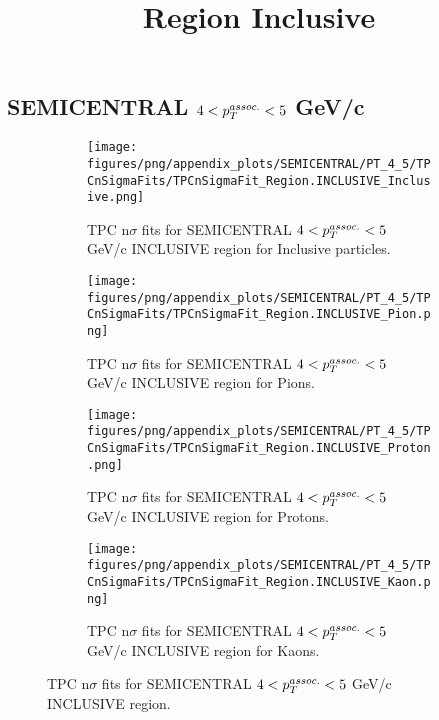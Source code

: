     
            \subsection{SEMICENTRAL $4 < \pTassoc < 5$ GeV/c}
            \begin{figure}[H]
                \title{Region Inclusive}
                \begin{subfigure}[b]{0.5\textwidth}
                    \centering
                    \texttt{[image: figures/png/appendix\_plots/SEMICENTRAL/PT\_4\_5/TPCnSigmaFits/TPCnSigmaFit\_Region.INCLUSIVE\_Inclusive.png]}
                    \caption{TPC n$\sigma$ fits for SEMICENTRAL $4 < \pTassoc < 5$ GeV/c INCLUSIVE region for Inclusive particles.}
                    \label{fig:appendix_SEMICENTRAL_$4 < \pTassoc < 5$ GeV/c_INCLUSIVE_Inclusive}
                \end{subfigure}
                \begin{subfigure}[b]{0.5\textwidth}
                    \centering
                    \texttt{[image: figures/png/appendix\_plots/SEMICENTRAL/PT\_4\_5/TPCnSigmaFits/TPCnSigmaFit\_Region.INCLUSIVE\_Pion.png]}
                    \caption{TPC n$\sigma$ fits for SEMICENTRAL $4 < \pTassoc < 5$ GeV/c INCLUSIVE region for Pions.}
                    \label{fig:appendix_SEMICENTRAL_$4 < \pTassoc < 5$ GeV/c_INCLUSIVE_Pion}
                \end{subfigure}
                \begin{subfigure}[b]{0.5\textwidth}
                    \centering
                    \texttt{[image: figures/png/appendix\_plots/SEMICENTRAL/PT\_4\_5/TPCnSigmaFits/TPCnSigmaFit\_Region.INCLUSIVE\_Proton.png]}
                    \caption{TPC n$\sigma$ fits for SEMICENTRAL $4 < \pTassoc < 5$ GeV/c INCLUSIVE region for Protons.}
                    \label{fig:appendix_SEMICENTRAL_$4 < \pTassoc < 5$ GeV/c_INCLUSIVE_Proton}
                \end{subfigure}
                \begin{subfigure}[b]{0.5\textwidth}
                    \centering
                    \texttt{[image: figures/png/appendix\_plots/SEMICENTRAL/PT\_4\_5/TPCnSigmaFits/TPCnSigmaFit\_Region.INCLUSIVE\_Kaon.png]}
                    \caption{TPC n$\sigma$ fits for SEMICENTRAL $4 < \pTassoc < 5$ GeV/c INCLUSIVE region for Kaons.}
                    \label{fig:appendix_SEMICENTRAL_$4 < \pTassoc < 5$ GeV/c_INCLUSIVE_Kaon}
                \end{subfigure}
                \caption{TPC n$\sigma$ fits for SEMICENTRAL $4 < \pTassoc < 5$ GeV/c INCLUSIVE region.}
                \label{fig:appendix_SEMICENTRAL_$4 < \pTassoc < 5$ GeV/c_INCLUSIVE}
            \end{figure}
